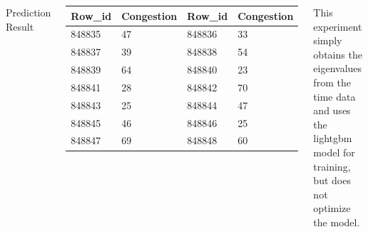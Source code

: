 \documentclass{tikzposter} %
\begin{document}
\begin{columns}
{}


{
\begin{description}
  	\item[Prediction Result] 
\end{description}
\vspace{.5cm}
\begin{center}
  \begin{tabular}{p{6cm}p{6cm}p{6cm}p{6cm}}
    \hline
      Row\_id & Congestion  &  Row\_id & Congestion \\
    \hline
    848835 & 47 & 848836 & 33\\
    848837 & 39 & 848838 & 54\\
    848839 & 64 & 848840 & 23\\
    848841 & 28 & 848842 & 70\\
    848843 & 25 & 848844 & 47\\
    848845 & 46 & 848846 & 25\\
    848847 & 69 & 848848 & 60\\
    \hline
    \end{tabular}
\end{center}
}


{
  This experiment simply obtains the eigenvalues from the time
   data and uses the 
  lightgbm model for training, 
  but does not optimize the model.
}






\end{columns}
\end{document}
